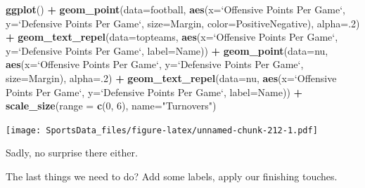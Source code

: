 \documentclass[]{book}
\newenvironment{Shaded}{\begin{snugshade}}{\end{snugshade}}
\newcommand{\DataTypeTok}[1]{\textcolor[rgb]{0.13,0.29,0.53}{#1}}
\newcommand{\DecValTok}[1]{\textcolor[rgb]{0.00,0.00,0.81}{#1}}
\newcommand{\KeywordTok}[1]{\textcolor[rgb]{0.13,0.29,0.53}{\textbf{#1}}}
\newcommand{\NormalTok}[1]{#1}
\newcommand{\OperatorTok}[1]{\textcolor[rgb]{0.81,0.36,0.00}{\textbf{#1}}}
\newcommand{\StringTok}[1]{\textcolor[rgb]{0.31,0.60,0.02}{#1}}
\begin{document}
\begin{Shaded}
\begin{Highlighting}[]
\KeywordTok{ggplot}\NormalTok{() }\OperatorTok{+}
\StringTok{  }\KeywordTok{geom_point}\NormalTok{(}\DataTypeTok{data=}\NormalTok{football, }\KeywordTok{aes}\NormalTok{(}\DataTypeTok{x=}\StringTok{`}\DataTypeTok{Offensive Points Per Game}\StringTok{`}\NormalTok{, }\DataTypeTok{y=}\StringTok{`}\DataTypeTok{Defensive Points Per Game}\StringTok{`}\NormalTok{, }\DataTypeTok{size=}\NormalTok{Margin, }\DataTypeTok{color=}\NormalTok{PositiveNegative), }\DataTypeTok{alpha=}\NormalTok{.}\DecValTok{2}\NormalTok{) }\OperatorTok{+}
\StringTok{  }\KeywordTok{geom_text_repel}\NormalTok{(}\DataTypeTok{data=}\NormalTok{topteams, }\KeywordTok{aes}\NormalTok{(}\DataTypeTok{x=}\StringTok{`}\DataTypeTok{Offensive Points Per Game}\StringTok{`}\NormalTok{, }\DataTypeTok{y=}\StringTok{`}\DataTypeTok{Defensive Points Per Game}\StringTok{`}\NormalTok{, }\DataTypeTok{label=}\NormalTok{Name)) }\OperatorTok{+}\StringTok{ }
\StringTok{  }\KeywordTok{geom_point}\NormalTok{(}\DataTypeTok{data=}\NormalTok{nu, }\KeywordTok{aes}\NormalTok{(}\DataTypeTok{x=}\StringTok{`}\DataTypeTok{Offensive Points Per Game}\StringTok{`}\NormalTok{, }\DataTypeTok{y=}\StringTok{`}\DataTypeTok{Defensive Points Per Game}\StringTok{`}\NormalTok{, }\DataTypeTok{size=}\NormalTok{Margin), }\DataTypeTok{alpha=}\NormalTok{.}\DecValTok{2}\NormalTok{) }\OperatorTok{+}
\StringTok{  }\KeywordTok{geom_text_repel}\NormalTok{(}\DataTypeTok{data=}\NormalTok{nu, }\KeywordTok{aes}\NormalTok{(}\DataTypeTok{x=}\StringTok{`}\DataTypeTok{Offensive Points Per Game}\StringTok{`}\NormalTok{, }\DataTypeTok{y=}\StringTok{`}\DataTypeTok{Defensive Points Per Game}\StringTok{`}\NormalTok{, }\DataTypeTok{label=}\NormalTok{Name)) }\OperatorTok{+}\StringTok{ }
\StringTok{  }\KeywordTok{scale_size}\NormalTok{(}\DataTypeTok{range =} \KeywordTok{c}\NormalTok{(}\DecValTok{0}\NormalTok{, }\DecValTok{6}\NormalTok{), }\DataTypeTok{name=}\StringTok{"Turnovers"}\NormalTok{)}
\end{Highlighting}
\end{Shaded}

\texttt{[image: SportsData\_files/figure-latex/unnamed-chunk-212-1.pdf]}

Sadly, no surprise there either.

The last things we need to do? Add some labels, apply our finishing touches.
\end{document}

